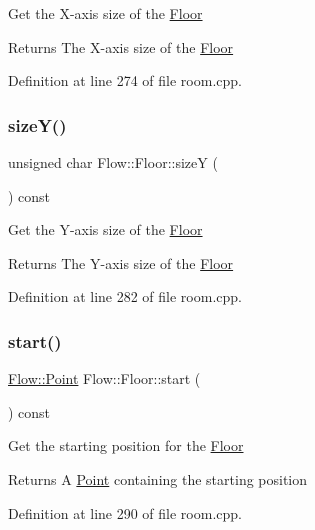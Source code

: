 Get the X-\/axis size of the \hyperlink{class_flow_1_1_floor}{Floor} \begin{DoxyReturn}{Returns}
The X-\/axis size of the \hyperlink{class_flow_1_1_floor}{Floor} 
\end{DoxyReturn}


Definition at line 274 of file room.\+cpp.

\hypertarget{class_flow_1_1_floor_a6b25e8faedfd7de16efea8523c45794c}{}\label{class_flow_1_1_floor_a6b25e8faedfd7de16efea8523c45794c} 
\subsubsection{\texorpdfstring{size\+Y()}{sizeY()}}
{\footnotesize\ttfamily unsigned char Flow\+::\+Floor\+::sizeY (\begin{DoxyParamCaption}{ }\end{DoxyParamCaption}) const}

Get the Y-\/axis size of the \hyperlink{class_flow_1_1_floor}{Floor} \begin{DoxyReturn}{Returns}
The Y-\/axis size of the \hyperlink{class_flow_1_1_floor}{Floor} 
\end{DoxyReturn}


Definition at line 282 of file room.\+cpp.

\hypertarget{class_flow_1_1_floor_aaac7f88dd55b4fe38ba36f686109fe7b}{}\label{class_flow_1_1_floor_aaac7f88dd55b4fe38ba36f686109fe7b} 
\subsubsection{\texorpdfstring{start()}{start()}}
{\footnotesize\ttfamily \hyperlink{struct_flow_1_1_point}{Flow\+::\+Point} Flow\+::\+Floor\+::start (\begin{DoxyParamCaption}{ }\end{DoxyParamCaption}) const}

Get the starting position for the \hyperlink{class_flow_1_1_floor}{Floor} \begin{DoxyReturn}{Returns}
A \hyperlink{struct_flow_1_1_point}{Point} containing the starting position 
\end{DoxyReturn}


Definition at line 290 of file room.\+cpp.

